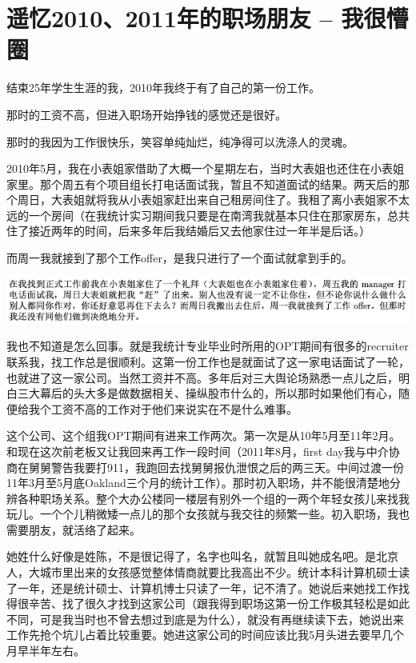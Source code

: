 \documentclass[9pt, b5paper]{article}
\begin{document}
\section{遥忆2010、2011年的职场朋友 -- 我很懵圈}
\label{sec:org5f78b63}

结束25年学生生涯的我，2010年我终于有了自己的第一份工作。

那时的工资不高，但进入职场开始挣钱的感觉还是很好。 

那时的我因为工作很快乐，笑容单纯灿烂，纯净得可以洗涤人的灵魂。

2010年5月，我在小表姐家借助了大概一个星期左右，当时大表姐也还住在小表姐家里。那个周五有个项目组长打电话面试我，暂且不知道面试的结果。两天后的那个周日，大表姐就将我从小表姐家赶出来自己租房间住了。我租了离小表姐家不太远的一个房间（在我统计实习期间我只要是在南湾我就基本只住在那家房东，总共住了接近两年的时间，后来多年后我结婚后又去他家住过一年半是后话。）

而周一我就接到了那个工作offer，是我只进行了一个面试就拿到手的。

\begin{center}
\includegraphics[width=.9\linewidth]{./pic/p1p47-3.png}
\end{center}

我也不知道是怎么回事。就是我统计专业毕业时所用的OPT期间有很多的recruiter联系我，找工作总是很顺利。这第一份工作也是就面试了这一家电话面试了一轮，也就进了这一家公司。当然工资并不高。多年后对三大舆论场熟悉一点儿之后，明白三大幕后的头大多是做数据相关、操纵股巿什么的，所以那时如果他们有心，随便给我个工资不高的工作对于他们来说实在不是什么难事。 

这个公司、这个组我OPT期间有进来工作两次。第一次是从10年5月至11年2月。和现在这次前老板又让我回来再工作一段时间（2011年8月，first day我与中介协商在舅舅警告我要打911，我跑回去找舅舅报仇泄恨之后的两三天。中间过渡一份11年3月至5月底Oakland三个月的统计工作）。那时初入职场，并不能很清楚地分辨各种职场关系。整个大办公楼同一楼层有别外一个组的一两个年轻女孩儿来找我玩儿。一个个儿稍微矮一点儿的那个女孩就与我交往的频繁一些。初入职场，我也需要朋友，就活络了起来。

她姓什么好像是姓陈，不是很记得了，名字也叫名，就暂且叫她成名吧。是北京人，大城市里出来的女孩感觉整体情商就要比我高出不少。统计本科计算机硕士读了一年，还是统计硕士、计算机博士只读了一年，记不清了。她说后来她找工作找得很辛苦、找了很久才找到这家公司（跟我得到职场这第一份工作极其轻松是如此不同，可是我当时也不曾去想过到底是为什么），就没有再继续读下去，她说出来工作先抢个坑儿占着比较重要。她进这家公司的时间应该比我5月头进去要早几个月早半年左右。
\end{document}

